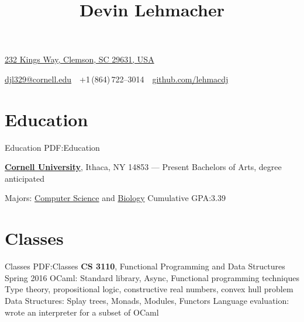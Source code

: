 \documentclass[letterpaper,10pt,oneside]{simpleresumecv}
\newcommand{\CVAuthor}{Devin Lehmacher}
\newcommand{\CVWebpage}{github.com/lehmacdj}
\begin{document}

\title{\CVAuthor}

\begin{subtitle}
\href{https://www.google.com/maps/place/232+Kings+Way,+Clemson,+SC+29631,+USA}
{232 Kings Way, Clemson, SC 29631, USA}
\par
\href{mailto:djl329@cornell.edu}
{djl329@cornell.edu}
\,\SubBulletSymbol\,
+1\,(864)\,722--3014
\,\SubBulletSymbol\,
\href{https://\CVWebpage}
{\CVWebpage}
\end{subtitle}

\begin{body}


\section%
{Education}
{Education}
{PDF:Education}

\href{https://www.cornell.edu}
{\textbf{Cornell University}},
Ithaca, NY 14853
\hfill
{} --- Present
\BulletItem%
Bachelors of Arts, degree anticipated
\begin{detail}
\SubBulletItem%
Majors:
\href{https://www.cs.cornell.edu}
{Computer Science}
and
\href{https://www.biology.cornell.edu}
{Biology}
\SubBulletItem%
Cumulative GPA:\@ 3.39
\end{detail}


\section%
{Classes}
{Classes}
{PDF:Classes}
{\textbf{CS 3110}}, Functional Programming and Data Structures
\hfill Spring 2016
\BulletItem%
OCaml: Standard library, Async, Functional programming techniques
\BulletItem%
Type theory, propositional logic, constructive real numbers, convex hull problem
\BulletItem%
Data Structures: Splay trees, Monads, Modules, Functors
\BulletItem%
Language evaluation: wrote an interpreter for a subset of OCaml
\GapNoBreak%


\end{body}
\end{document}
